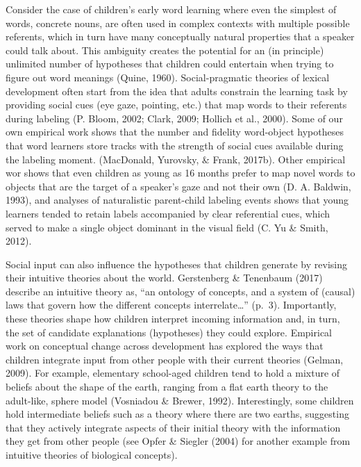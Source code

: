 \documentclass[oneside]{report}
\begin{document}
Consider the case of children's early word learning where even the
simplest of words, concrete nouns, are often used in complex contexts
with multiple possible referents, which in turn have many conceptually
natural properties that a speaker could talk about. This ambiguity
creates the potential for an (in principle) unlimited number of
hypotheses that children could entertain when trying to figure out word
meanings (Quine, 1960). Social-pragmatic theories of lexical development
often start from the idea that adults constrain the learning task by
providing social cues (eye gaze, pointing, etc.) that map words to their
referents during labeling (P. Bloom, 2002; Clark, 2009; Hollich et al.,
2000). Some of our own empirical work shows that the number and fidelity
word-object hypotheses that word learners store tracks with the strength
of social cues available during the labeling moment. (MacDonald,
Yurovsky, \& Frank, 2017b). Other empirical wor shows that even children
as young as 16 months prefer to map novel words to objects that are the
target of a speaker's gaze and not their own (D. A. Baldwin, 1993), and
analyses of naturalistic parent-child labeling events shows that young
learners tended to retain labels accompanied by clear referential cues,
which served to make a single object dominant in the visual field (C. Yu
\& Smith, 2012).

Social input can also influence the hypotheses that children generate by
revising their intuitive theories about the world. Gerstenberg \&
Tenenbaum (2017) describe an intuitive theory as, ``an ontology of
concepts, and a system of (causal) laws that govern how the different
concepts interrelate\ldots{}'' (p.~3). Importantly, these theories shape
how children interpret incoming information and, in turn, the set of
candidate explanations (hypotheses) they could explore. Empirical work
on conceptual change across development has explored the ways that
children integrate input from other people with their current theories
(Gelman, 2009). For example, elementary school-aged children tend to
hold a mixture of beliefs about the shape of the earth, ranging from a
flat earth theory to the adult-like, sphere model (Vosniadou \& Brewer,
1992). Interestingly, some children hold intermediate beliefs such as a
theory where there are two earths, suggesting that they actively
integrate aspects of their initial theory with the information they get
from other people (see Opfer \& Siegler (2004) for another example from
intuitive theories of biological concepts).
\end{document}
